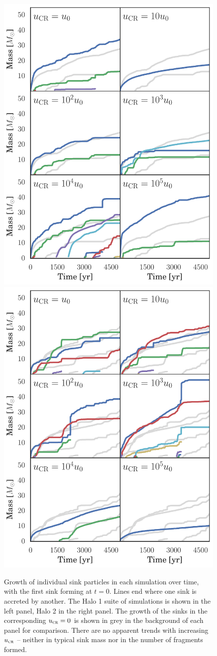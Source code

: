 \documentclass{thesis}
\newcommand{\ucr}{\ensuremath{{u}_{\textsc{cr}}}\xspace}
\begin{document}
\begin{figure}
\begin{center}
\includegraphics[width=.49\textwidth]{figures/sink_masses/sink_masses_halo1}
\includegraphics[width=.49\textwidth]{figures/sink_masses/sink_masses_halo2}
\caption{\label{fig:sinks} 
Growth of individual sink particles in each simulation over time, with the first sink forming at $t=0$. 
Lines end where one sink is accreted by another. 
The Halo 1 suite of simulations is shown in the left panel, Halo 2 in the right panel.  
The growth of the sinks in the corresponding $\ucr=0$ is shown in grey in the background of each panel for comparison. 
There are no apparent trends with increasing $\ucr$ -- neither in typical sink mass nor in the number of fragments formed.%
}
\end{center}
\end{figure}
\end{document}
